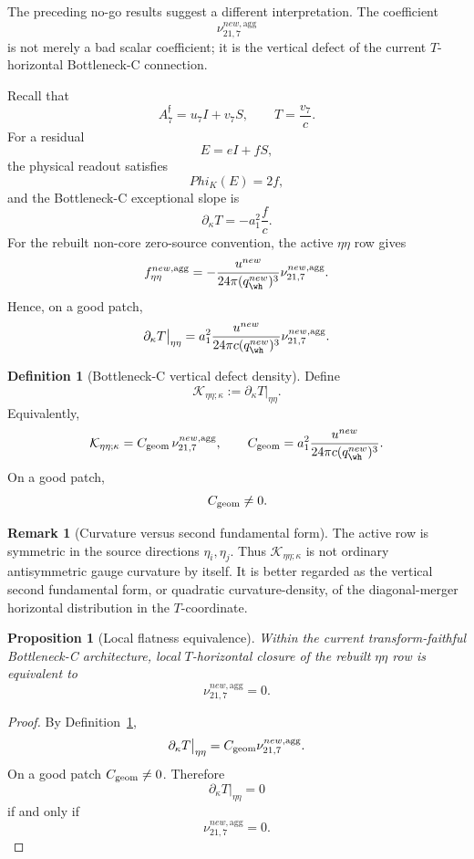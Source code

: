 \documentclass[11pt,a4paper]{amsart}
\def\Phi{Phi}%
\def\new{new}%
\theoremstyle{plain}
\newtheorem{proposition}[theorem]{Proposition}
\theoremstyle{definition}
\newtheorem{definition}[theorem]{Definition}
\newtheorem{remark}[theorem]{Remark}
\newcommand{\new}{\mathrm{new}}
\begin{document}
The preceding no-go results suggest a different interpretation.  The
coefficient
\[
\nu_{21,7}^{\new,\mathrm{agg}}
\]
is not merely a bad scalar coefficient; it is the vertical defect of the
current \(T\)-horizontal Bottleneck-C connection.

Recall that
\[
A_7^{\mathfrak f}=u_7I+v_7S,
\qquad
T=\frac{v_7}{c}.
\]
For a residual
\[
E=eI+fS,
\]
the physical readout satisfies
\[
\Phi_K(E)=2f,
\]
and the Bottleneck-C exceptional slope is
\[
\partial_\kappa T=-a_1^2\frac{f}{c}.
\]
For the rebuilt non-core zero-source convention, the active \(\eta\eta\) row
gives
\[
f_{\eta\eta}^{\new,\mathrm{agg}}
=
-\frac{u^{\new}}{24\pi(q_{\wh}^{\new})^3}
\nu_{21,7}^{\new,\mathrm{agg}}.
\]
Hence, on a good patch,
\[
\partial_\kappa T\big|_{\eta\eta}
=
a_1^2
\frac{u^{\new}}{24\pi c(q_{\wh}^{\new})^3}
\nu_{21,7}^{\new,\mathrm{agg}}.
\]

\begin{definition}[Bottleneck-C vertical defect density]
\label{def:bottleneck-c-vertical-defect-density}
Define
\[
\mathcal K_{\eta\eta;\kappa}
:=
\partial_\kappa T\big|_{\eta\eta}.
\]
Equivalently,
\[
\mathcal K_{\eta\eta;\kappa}
=
C_{\rm geom}\,
\nu_{21,7}^{\new,\mathrm{agg}},
\qquad
C_{\rm geom}
=
a_1^2
\frac{u^{\new}}{24\pi c(q_{\wh}^{\new})^3}.
\]
On a good patch,
\[
C_{\rm geom}\ne0.
\]
\end{definition}

\begin{remark}[Curvature versus second fundamental form]
\label{rem:curvature-versus-second-fundamental-form-bc}
The active row is symmetric in the source directions \(\eta_i,\eta_j\).  Thus
\(\mathcal K_{\eta\eta;\kappa}\) is not ordinary antisymmetric gauge curvature
by itself.  It is better regarded as the vertical second fundamental form, or
quadratic curvature-density, of the diagonal-merger horizontal distribution in
the \(T\)-coordinate.
\end{remark}

\begin{proposition}[Local flatness equivalence]
\label{prop:local-flatness-equivalence-bc}
Within the current transform-faithful Bottleneck-C architecture, local
\(T\)-horizontal closure of the rebuilt \(\eta\eta\) row is equivalent to
\[
\nu_{21,7}^{\new,\mathrm{agg}}=0.
\]
\end{proposition}

\begin{proof}
By Definition~\ref{def:bottleneck-c-vertical-defect-density},
\[
\partial_\kappa T\big|_{\eta\eta}
=
C_{\rm geom}
\nu_{21,7}^{\new,\mathrm{agg}}.
\]
On a good patch \(C_{\rm geom}\ne0\).  Therefore
\[
\partial_\kappa T\big|_{\eta\eta}=0
\]
if and only if
\[
\nu_{21,7}^{\new,\mathrm{agg}}=0.
\]
\end{proof}
\end{document}
